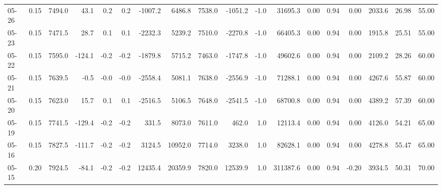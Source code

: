 \begin{threeparttable}
{\begin{tabular}{lrrrrrrrrrrrrrrrrr}
  05-26 &     0.15 & 7494.0 &              43.1 &               0.2 &                0.2 &            -1007.2 &  6486.8 & 7538.0 &    -1051.2 &                     -1.0 &             31695.3 &       0.00 &      0.94 &           0.00 &           2033.6 &           26.98 &                  55.00 \\
  05-23 &     0.15 & 7471.5 &              28.7 &               0.1 &                0.1 &            -2232.3 &  5239.2 & 7510.0 &    -2270.8 &                     -1.0 &             66405.3 &       0.00 &      0.94 &           0.00 &           1915.8 &           25.51 &                  55.00 \\
  05-22 &     0.15 & 7595.0 &            -124.1 &              -0.2 &               -0.2 &            -1879.8 &  5715.2 & 7463.0 &    -1747.8 &                     -1.0 &             49602.6 &       0.00 &      0.94 &           0.00 &           2109.2 &           28.26 &                  60.00 \\
  05-21 &     0.15 & 7639.5 &              -0.5 &              -0.0 &               -0.0 &            -2558.4 &  5081.1 & 7638.0 &    -2556.9 &                     -1.0 &             71288.1 &       0.00 &      0.94 &           0.00 &           4267.6 &           55.87 &                  60.00 \\
  05-20 &     0.15 & 7623.0 &              15.7 &               0.1 &                0.1 &            -2516.5 &  5106.5 & 7648.0 &    -2541.5 &                     -1.0 &             68700.8 &       0.00 &      0.94 &           0.00 &           4389.2 &           57.39 &                  60.00 \\
  05-19 &     0.15 & 7741.5 &            -129.4 &              -0.2 &               -0.2 &              331.5 &  8073.0 & 7611.0 &      462.0 &                      1.0 &             12113.4 &       0.00 &      0.94 &           0.00 &           4126.0 &           54.21 &                  65.00 \\
  05-16 &     0.15 & 7827.5 &            -111.7 &              -0.2 &               -0.2 &             3124.5 & 10952.0 & 7714.0 &     3238.0 &                      1.0 &             82628.1 &       0.00 &      0.94 &           0.00 &           4278.8 &           55.47 &                  65.00 \\
  05-15 &     0.20 & 7924.5 &             -84.1 &              -0.2 &               -0.2 &            12435.4 & 20359.9 & 7820.0 &    12539.9 &                      1.0 &            311387.6 &       0.00 &      0.94 &          -0.20 &           3934.5 &           50.31 &                  70.00 \\

\end{tabular}}
\end{threeparttable}
